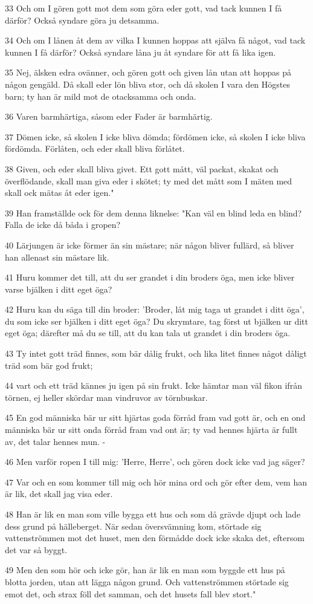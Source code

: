 \par 33 Och om I gören gott mot dem som göra eder gott, vad tack kunnen I få därför? Också syndare göra ju detsamma.
\par 34 Och om I lånen åt dem av vilka I kunnen hoppas att själva få något, vad tack kunnen I få därför? Också syndare låna ju åt syndare för att få lika igen.
\par 35 Nej, älsken edra ovänner, och gören gott och given lån utan att hoppas på någon gengäld. Då skall eder lön bliva stor, och då skolen I vara den Högstes barn; ty han är mild mot de otacksamma och onda.
\par 36 Varen barmhärtiga, såsom eder Fader är barmhärtig.
\par 37 Dömen icke, så skolen I icke bliva dömda; fördömen icke, så skolen I icke bliva fördömda. Förlåten, och eder skall bliva förlåtet.
\par 38 Given, och eder skall bliva givet. Ett gott mått, väl packat, skakat och överflödande, skall man giva eder i skötet; ty med det mått som I mäten med skall ock mätas åt eder igen."
\par 39 Han framställde ock för dem denna liknelse: "Kan väl en blind leda en blind? Falla de icke då båda i gropen?
\par 40 Lärjungen är icke förmer än sin mästare; när någon bliver fullärd, så bliver han allenast sin mästare lik.
\par 41 Huru kommer det till, att du ser grandet i din broders öga, men icke bliver varse bjälken i ditt eget öga?
\par 42 Huru kan du säga till din broder: 'Broder, låt mig taga ut grandet i ditt öga', du som icke ser bjälken i ditt eget öga? Du skrymtare, tag först ut bjälken ur ditt eget öga; därefter må du se till, att du kan tala ut grandet i din broders öga.
\par 43 Ty intet gott träd finnes, som bär dålig frukt, och lika litet finnes något dåligt träd som bär god frukt;
\par 44 vart och ett träd kännes ju igen på sin frukt. Icke hämtar man väl fikon ifrån törnen, ej heller skördar man vindruvor av törnbuskar.
\par 45 En god människa bär ur sitt hjärtas goda förråd fram vad gott är, och en ond människa bär ur sitt onda förråd fram vad ont är; ty vad hennes hjärta är fullt av, det talar hennes mun. -
\par 46 Men varför ropen I till mig: 'Herre, Herre', och gören dock icke vad jag säger?
\par 47 Var och en som kommer till mig och hör mina ord och gör efter dem, vem han är lik, det skall jag visa eder.
\par 48 Han är lik en man som ville bygga ett hus och som då grävde djupt och lade dess grund på hälleberget. När sedan översvämning kom, störtade sig vattenströmmen mot det huset, men den förmådde dock icke skaka det, eftersom det var så byggt.
\par 49 Men den som hör och icke gör, han är lik en man som byggde ett hus på blotta jorden, utan att lägga någon grund. Och vattenströmmen störtade sig emot det, och strax föll det samman, och det husets fall blev stort."


